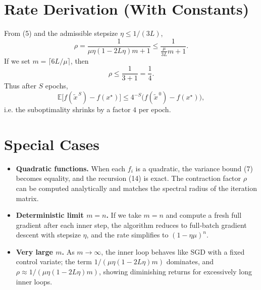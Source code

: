 \documentclass{article}
\newcommand{\E}{\mathbb{E}}
\begin{document}
\section*{Rate Derivation (With Constants)}
From (5) and the admissible stepsize $\eta\le 1/(3L)$,
\[
\rho = \frac{1}{\mu\eta(1-2L\eta)m+1}
\le \frac{1}{\frac{\mu}{3L}m+1}.
\]
If we set $m = \lceil 6L/\mu\rceil$, then
\[
\rho \le \frac{1}{3+1}= \frac14.
\]
Thus after $S$ epochs,
\[
\E\!\bigl[f(\tilde x^{\,S})-f(x^\star)\bigr]\le 4^{-S}\bigl(f(\tilde x^{\,0})-f(x^\star)\bigr),
\]
i.e. the suboptimality shrinks by a factor $4$ per epoch.

\section*{Special Cases}
\begin{itemize}[leftmargin=*]
\item \textbf{Quadratic functions.}  When each $f_i$ is a quadratic, the variance bound (7) becomes equality, and the recursion (14) is exact. The contraction factor $\rho$ can be computed analytically and matches the spectral radius of the iteration matrix.
\item \textbf{Deterministic limit $m=n$.}  If we take $m=n$ and compute a fresh full gradient after each inner step, the algorithm reduces to full‑batch gradient descent with stepsize $\eta$, and the rate simplifies to $(1-\eta\mu)^n$.
\item \textbf{Very large $m$.}  As $m\to\infty$, the inner loop behaves like SGD with a fixed control variate; the term $1/(\mu\eta(1-2L\eta)m)$ dominates, and $\rho\approx 1/(\mu\eta(1-2L\eta)m)$, showing diminishing returns for excessively long inner loops.
\end{itemize}
\end{document}
